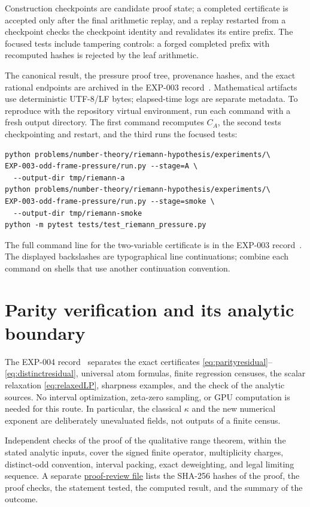 \documentclass[11pt]{article}
\theoremstyle{remark}
\begin{document}
Construction checkpoints are candidate proof state; a completed
certificate is accepted only after the final arithmetic replay, and a
replay restarted from a checkpoint checks the checkpoint identity and
revalidates its entire prefix. The focused tests include tampering
controls: a forged completed prefix with recomputed hashes is rejected by
the leaf arithmetic.

The canonical result, the pressure proof tree, provenance hashes, and the
exact rational endpoints are archived in the EXP-003
record~\cite{RecordIII}. Mathematical artifacts use deterministic UTF-8/LF
bytes; elapsed-time logs are separate metadata. To reproduce with the
repository virtual environment, run each command with a fresh output
directory. The first command recomputes $C_A$, the second tests
checkpointing and restart, and the third runs the focused tests:
\begin{verbatim}
python problems/number-theory/riemann-hypothesis/experiments/\
EXP-003-odd-frame-pressure/run.py --stage=A \
  --output-dir tmp/riemann-a
python problems/number-theory/riemann-hypothesis/experiments/\
EXP-003-odd-frame-pressure/run.py --stage=smoke \
  --output-dir tmp/riemann-smoke
python -m pytest tests/test_riemann_pressure.py
\end{verbatim}
The full command line for the two-variable certificate is in the EXP-003
record~\cite{RecordIII}. The displayed backslashes are typographical line
continuations; combine each command on shells that use another
continuation convention.

\section{Parity verification and its analytic boundary}

The EXP-004 record~\cite{RecordIV}
separates the exact certificates \eqref{eq:parityresidual}--%
\eqref{eq:distinctresidual}, universal atom formulas, finite regression
censuses, the scalar relaxation \eqref{eq:relaxedLP}, sharpness examples,
and the check of the analytic sources. No interval optimization, zeta-zero
sampling, or GPU computation is needed for this route. In particular,
the classical $\kappa$ and the new numerical exponent are deliberately
unevaluated fields, not outputs of a finite census.

Independent checks of the proof of the qualitative range theorem, within
the stated analytic inputs, cover the signed finite operator,
multiplicity charges, distinct-odd convention, interval packing, exact
deweighting, and legal limiting sequence. A separate
\href{https://github.com/fsantibanezleal/CAOS_RESEARCH/blob/main/problems/number-theory/riemann-hypothesis/experiments/EXP-004-parity-density-transfer/proof-review.json}{proof-review file}
lists the SHA-256 hashes of the proof, the proof checks, the statement
tested, the computed result, and the summary of the outcome.
\end{document}
